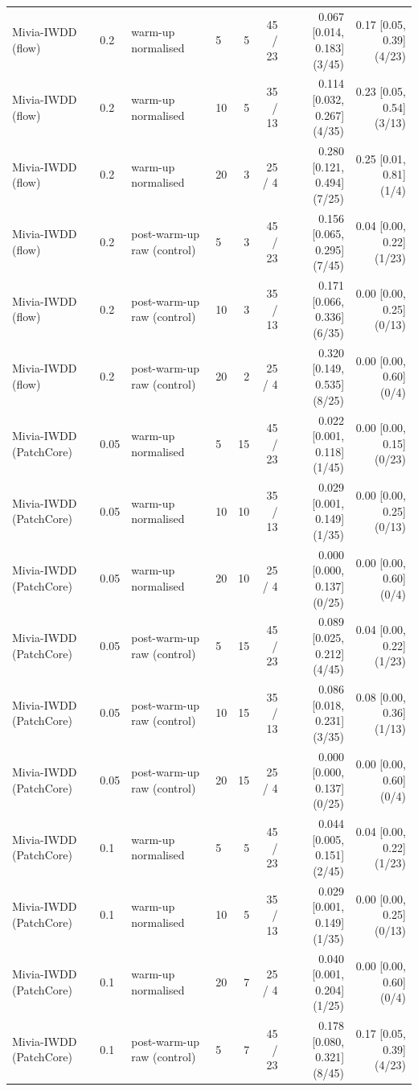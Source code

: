 \begin{table}[t]
{\begin{tabular}{llllrrrr}
Mivia-IWDD (flow) & 0.2 & warm-up normalised & 5 & 5 & 45 / 23 & 0.067 [0.014, 0.183] (3/45) & 0.17 [0.05, 0.39] (4/23) \\
Mivia-IWDD (flow) & 0.2 & warm-up normalised & 10 & 5 & 35 / 13 & 0.114 [0.032, 0.267] (4/35) & 0.23 [0.05, 0.54] (3/13) \\
Mivia-IWDD (flow) & 0.2 & warm-up normalised & 20 & 3 & 25 / 4 & 0.280 [0.121, 0.494] (7/25) & 0.25 [0.01, 0.81] (1/4) \\
Mivia-IWDD (flow) & 0.2 & post-warm-up raw (control) & 5 & 3 & 45 / 23 & 0.156 [0.065, 0.295] (7/45) & 0.04 [0.00, 0.22] (1/23) \\
Mivia-IWDD (flow) & 0.2 & post-warm-up raw (control) & 10 & 3 & 35 / 13 & 0.171 [0.066, 0.336] (6/35) & 0.00 [0.00, 0.25] (0/13) \\
Mivia-IWDD (flow) & 0.2 & post-warm-up raw (control) & 20 & 2 & 25 / 4 & 0.320 [0.149, 0.535] (8/25) & 0.00 [0.00, 0.60] (0/4) \\
Mivia-IWDD (PatchCore) & 0.05 & warm-up normalised & 5 & 15 & 45 / 23 & 0.022 [0.001, 0.118] (1/45) & 0.00 [0.00, 0.15] (0/23) \\
Mivia-IWDD (PatchCore) & 0.05 & warm-up normalised & 10 & 10 & 35 / 13 & 0.029 [0.001, 0.149] (1/35) & 0.00 [0.00, 0.25] (0/13) \\
Mivia-IWDD (PatchCore) & 0.05 & warm-up normalised & 20 & 10 & 25 / 4 & 0.000 [0.000, 0.137] (0/25) & 0.00 [0.00, 0.60] (0/4) \\
Mivia-IWDD (PatchCore) & 0.05 & post-warm-up raw (control) & 5 & 15 & 45 / 23 & 0.089 [0.025, 0.212] (4/45) & 0.04 [0.00, 0.22] (1/23) \\
Mivia-IWDD (PatchCore) & 0.05 & post-warm-up raw (control) & 10 & 15 & 35 / 13 & 0.086 [0.018, 0.231] (3/35) & 0.08 [0.00, 0.36] (1/13) \\
Mivia-IWDD (PatchCore) & 0.05 & post-warm-up raw (control) & 20 & 15 & 25 / 4 & 0.000 [0.000, 0.137] (0/25) & 0.00 [0.00, 0.60] (0/4) \\
Mivia-IWDD (PatchCore) & 0.1 & warm-up normalised & 5 & 5 & 45 / 23 & 0.044 [0.005, 0.151] (2/45) & 0.04 [0.00, 0.22] (1/23) \\
Mivia-IWDD (PatchCore) & 0.1 & warm-up normalised & 10 & 5 & 35 / 13 & 0.029 [0.001, 0.149] (1/35) & 0.00 [0.00, 0.25] (0/13) \\
Mivia-IWDD (PatchCore) & 0.1 & warm-up normalised & 20 & 7 & 25 / 4 & 0.040 [0.001, 0.204] (1/25) & 0.00 [0.00, 0.60] (0/4) \\
Mivia-IWDD (PatchCore) & 0.1 & post-warm-up raw (control) & 5 & 7 & 45 / 23 & 0.178 [0.080, 0.321] (8/45) & 0.17 [0.05, 0.39] (4/23) \\

\end{tabular}}
\end{table}
